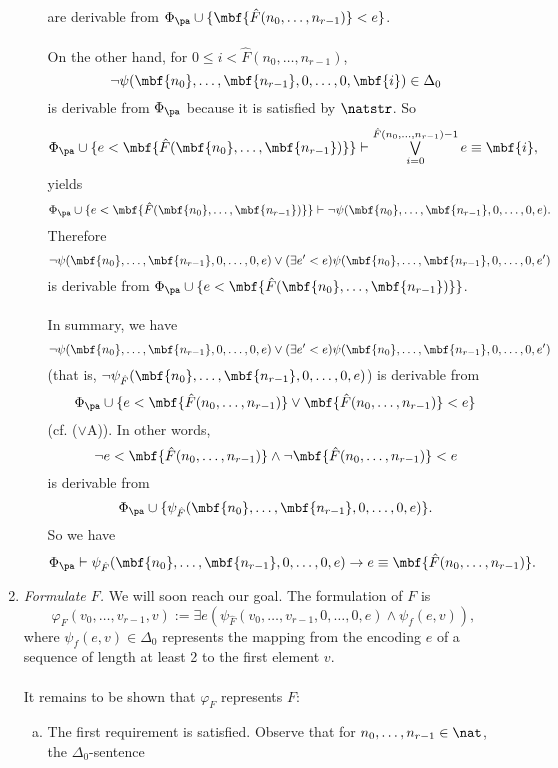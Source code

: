 \begin{enumerate}[(1)]
\begin{enumerate}[(a)]
\[\]
are derivable from $\Phi_\pa \cup \{ \mbf{\hat{F}(n_0, \ldots, n_{r - 1})} < e \}$.\\
\ \\
On the other hand, for $0 \leq i < \hat{F}(n_0, \ldots, n_{r - 1})$,
\[
\neg\psi(\mbf{n_0}, \ldots, \mbf{n_{r - 1}}, 0, \ldots, 0, \mbf{i}) \in \Delta_0
\]
is derivable from $\Phi_\pa$ because it is satisfied by $\natstr$. So
\[
\Phi_\pa \cup \{ e < \mbf{\hat{F}(\mbf{n_0}, \ldots, \mbf{n_{r - 1}})} \} \vdash \textstyle\bigvee\limits_{i = 0}^{\hat{F}(n_0, \ldots, n_{r - 1}) - 1} e \equiv \mbf{i},
\]
yields
\[
\Phi_\pa \cup \{ e < \mbf{\hat{F}(\mbf{n_0}, \ldots, \mbf{n_{r - 1}})} \} \vdash \neg\psi(\mbf{n_0}, \ldots, \mbf{n_{r - 1}}, 0, \ldots, 0, e).
\]
Therefore
\[
\neg\psi(\mbf{n_0}, \ldots, \mbf{n_{r - 1}}, 0, \ldots, 0, e) \lor (\exists e^\prime < e) \psi(\mbf{n_0}, \ldots, \mbf{n_{r - 1}}, 0, \ldots, 0, e^\prime)
\]
is derivable from $\Phi_\pa \cup \{ e < \mbf{\hat{F}(\mbf{n_0}, \ldots, \mbf{n_{r - 1}})} \}$.\\
\ \\
In summary, we have
\[
\neg\psi(\mbf{n_0}, \ldots, \mbf{n_{r - 1}}, 0, \ldots, 0, e) \lor (\exists e^\prime < e) \psi(\mbf{n_0}, \ldots, \mbf{n_{r - 1}}, 0, \ldots, 0, e^\prime)
\]
(that is, $\neg\psi_{\hat{F}}(\mbf{n_0}, \ldots, \mbf{n_{r - 1}}, 0, \ldots, 0, e)$) is derivable from
\[
\Phi_\pa \cup \{ e < \mbf{\hat{F}(n_0, \ldots, n_{r - 1})} \lor \mbf{\hat{F}(n_0, \ldots, n_{r - 1})} < e \}
\]
(cf. ($\lor$A)). In other words,
\[
\neg e < \mbf{\hat{F}(n_0, \ldots, n_{r - 1})} \land \neg\mbf{\hat{F}(n_0, \ldots, n_{r - 1})} < e
\]
is derivable from
\[
\Phi_\pa \cup \{ \psi_{\hat{F}}(\mbf{n_0}, \ldots, \mbf{n_{r - 1}}, 0, \ldots, 0, e) \}.
\]
So we have
\[
\Phi_\pa \vdash \psi_{\hat{F}}(\mbf{n_0}, \ldots, \mbf{n_{r - 1}}, 0, \ldots, 0, e) \rightarrow e \equiv \mbf{\hat{F}(n_0, \ldots, n_{r - 1})}.
\]
\end{enumerate}
\item \emph{Formulate $F$.} We will soon reach our goal. The formulation of $F$ is
\[
\varphi_F(v_0, \ldots, v_{r - 1}, v) := \exists e (\psi_{\hat{F}}(v_0, \ldots, v_{r - 1}, 0, \ldots, 0, e) \land \psi_f(e, v)),
\]
where $\psi_f(e, v) \in \Delta_0$ represents the mapping from the encoding $e$ of a sequence of length at least 2 to the first element $v$.\\
\ \\
It remains to be shown that $\varphi_F$ represents $F$:
\begin{enumerate}[(a)]
\item The first requirement is satisfied. Observe that for $n_0, \ldots, n_{r - 1} \in \nat$, the $\Delta_0$-sentence

\end{enumerate}
\end{enumerate}
